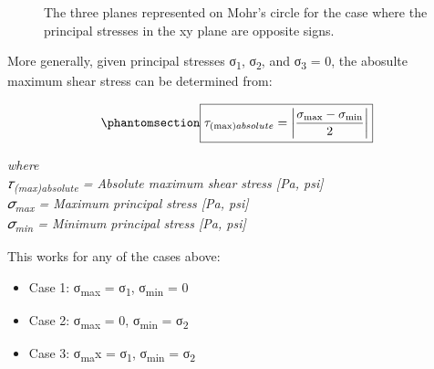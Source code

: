 \documentclass[
  letterpaper,
  DIV=11,
  numbers=noendperiod]{scrreprt}
\theoremstyle{definition}
\theoremstyle{remark}
\begin{document}
\begin{figure}


\caption{\label{fig-12.15}The three planes represented on Mohr's circle
for the case where the principal stresses in the xy plane are opposite
signs.}

\end{figure}%

More generally, given principal stresses σ\textsubscript{1},
σ\textsubscript{2}, and σ\textsubscript{3} = 0, the abosulte maximum
shear stress can be determined from:

\begin{equation}\phantomsection\label{eq-12.4}{
\boxed{\tau_{(\max)absolute}=\left|\frac{\sigma_{\max }-\sigma_{\min }}{2}\right|}
}\end{equation}

\emph{where}\\
\emph{𝜏\textsubscript{(max)absolute} = Absolute maximum shear stress
{[}Pa, psi{]}}\\
\emph{𝜎\textsubscript{max} = Maximum principal stress {[}Pa, psi{]}}\\
\emph{𝜎\textsubscript{min} = Minimum principal stress {[}Pa, psi{]}}

This works for any of the cases above:

\begin{itemize}
\item
  Case 1: σ\textsubscript{max} = σ\textsubscript{1},
  σ\textsubscript{min} = 0
\item
  Case 2: σ\textsubscript{max} = 0, σ\textsubscript{min} =
  σ\textsubscript{2}
\item
  Case 3: σ\textsubscript{ma}x = σ\textsubscript{1},
  σ\textsubscript{min} = σ\textsubscript{2}
\end{itemize}
\end{document}
